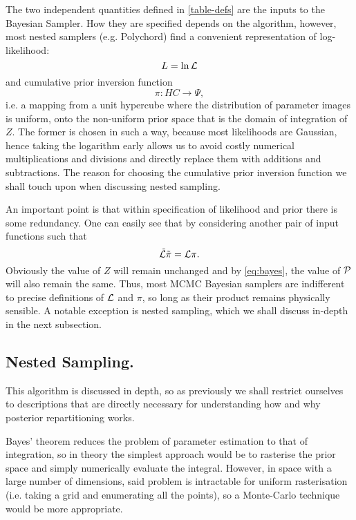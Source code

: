 \documentclass[usenatbib]{mnras}
\begin{document}
The two independent quantities defined in \autoref{table-defs} are the
inputs to the Bayesian Sampler. How they are specified depends on the algorithm, however, most nested samplers (e.g. Polychord) find a convenient representation of log-likelihood: 
\begin{equation}
  L = \ln \cal L
\end{equation}
and cumulative prior inversion function 
\begin{equation}
 \pi : HC \rightarrow \Psi,
\end{equation}
i.e. a mapping from a unit hypercube where the distribution of
parameter images is uniform, onto the non-uniform prior space that
is the domain of integration of \(Z\). The former is chosen in such
a way, because most likelihoods are Gaussian, hence taking the
logarithm early allows us to avoid costly numerical multiplications
and divisions and directly replace them with additions and
subtractions. The reason for choosing the cumulative prior inversion function
we shall touch upon when discussing nested sampling.

An important point is that within specification of likelihood and
prior there is some redundancy. One can easily see that by
considering another pair of input functions such that 
\begin{equation}
  \tilde{\cal L} \tilde{\pi} = \cal L \pi. 
\end{equation}
Obviously the value of \(Z\) will remain unchanged and by
\autoref{eq:bayes}, the value of \(\cal P\) will also remain the
same. Thus, most MCMC Bayesian samplers are indifferent to precise
definitions of \(\cal L\) and \(\pi\), so long as their product
remains physically sensible. A notable exception is nested
sampling, which we shall discuss in-depth in the next subsection.

\subsection{Nested Sampling.}
\label{sec:org9ef103f}

This algorithm is discussed in depth, so as previously we shall
restrict ourselves to descriptions that are directly necessary for
understanding how and why posterior repartitioning works.

Bayes' theorem reduces the problem of parameter estimation to that
of integration, so in theory the simplest approach would be to
rasterise the prior space and simply numerically evaluate the
integral. However, in space with a large number of dimensions, said
problem is intractable for uniform rasterisation (i.e. taking a
grid and enumerating all the points), so a Monte-Carlo technique
would be more appropriate.
\end{document}
